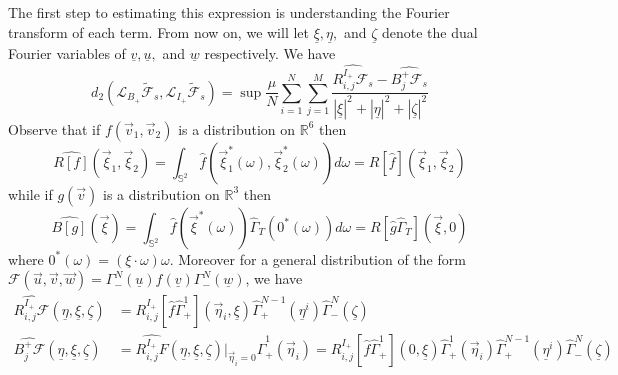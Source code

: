 \documentclass{article}
\newcommand{\scrF}{{\mathscr F}}
\newcommand*\R{ \mathds{R} }
\newcommand*\cL{ \mathcal{L} }
\newcommand\uv{{\underline v}}
\newcommand\uu{{\underline u}}
\newcommand\uw{{\underline w}}
\newcommand\uxi{{\underline \xi}}
\newcommand\ueta{{\underline \eta}}
\newcommand\uzeta{{\underline \zeta}}
\newcommand\vv{{\vec v}}
\newcommand\vxi{{\vec \xi}}
\newcommand\veta{{\vec \eta}}
\renewcommand\S{{\mathds S}}
\begin{document}
The first step to estimating this expression is understanding the Fourier transform of each term. From now on, we will
let $\uxi, \ueta,$ and $\uzeta$ denote the dual Fourier variables of $\uv, \uu,$ and $\uw$ respectively. We have
\begin{equation}\label{eq:FirstReservoirD2}
	d_2(\cL_{B_+}\widetilde \scrF_s, \cL_{I_+} \widetilde \scrF_s) = \sup
\frac{\mu}{N}\sum_{i = 1}^{N}\sum_{j = 1}^M \frac{
	\widehat{R_{i,j}^{I_+}\scrF_s} - \widehat{B^+_j \scrF_s}}{|\uxi|^2 +
|\ueta|^2 + |\uzeta|^2}
\end{equation} 
Observe that if $f(\vv_1,\vv_2)$ is a distribution on $\R^6$ then
\[
\widehat{R[f]}(\vxi_1,\vxi_2)=\int_{\S^2} \hat f(\vxi_1^*(\omega),\vxi_2^*(\omega))d\omega=R[\hat f](\vxi_1,\vxi_2)
\]
while if $g(\vv)$ is a distribution on $\R^3$ then
\[
\widehat{B[g]}(\vxi)=\int_{\S^2} \hat f(\vxi^*(\omega))\widehat\Gamma_T(0^*(\omega))d\omega=R[\hat g\widehat\Gamma_T](\vxi,0)
\]
where $0^*(\omega)=(\xi\cdot\omega)\omega$.
Moreover for a general distribution of the form $\scrF(\vec u, \vec v, \vec w) = \Gamma^{N}_-(\uu)  f(\uv) 
\Gamma^{N}_-(\uw)$, we have
\begin{align}
\label{eq:FirstFourierFormula}
\widehat{R_{i,j}^{I_+} \scrF}(\ueta, \uxi, \uzeta) &= R_{i,j}^{I_+} \left[\hat f
\widehat\Gamma^1_+\right] (\veta_i,\uxi)\widehat\Gamma^{N - 1}_+(\ueta^i)
\widehat\Gamma^{N}_-(\uzeta)\\
\widehat{B_{j}^+ \scrF}(\ueta, \uxi, \uzeta) &= \widehat{R_{i,j}^{I_+} F}(
\ueta, \uxi, \uzeta)\bigr|_{\veta_i=0}
\widehat\Gamma^{1}_+(\veta_i) =R_{i,j}^{I_+} \left[\hat f
\widehat\Gamma^1_+\right]
(0,\uxi)\widehat\Gamma^{1}_+(\veta_i)\widehat\Gamma^{N - 1}_+(\ueta^i)
\widehat\Gamma^{N}_-(\uzeta)
\end{align}
\end{document}
